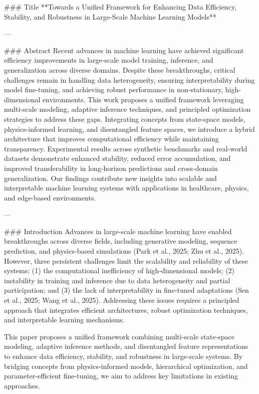 ### Title  
**Towards a Unified Framework for Enhancing Data Efficiency, Stability, and Robustness in Large-Scale Machine Learning Models**

---

### Abstract  
Recent advances in machine learning have achieved significant efficiency improvements in large-scale model training, inference, and generalization across diverse domains. Despite these breakthroughs, critical challenges remain in handling data heterogeneity, ensuring interpretability during model fine-tuning, and achieving robust performance in non-stationary, high-dimensional environments. This work proposes a unified framework leveraging multi-scale modeling, adaptive inference techniques, and principled optimization strategies to address these gaps. Integrating concepts from state-space models, physics-informed learning, and disentangled feature spaces, we introduce a hybrid architecture that improves computational efficiency while maintaining transparency. Experimental results across synthetic benchmarks and real-world datasets demonstrate enhanced stability, reduced error accumulation, and improved transferability in long-horizon predictions and cross-domain generalization. Our findings contribute new insights into scalable and interpretable machine learning systems with applications in healthcare, physics, and edge-based environments.

---

### Introduction  
Advances in large-scale machine learning have enabled breakthroughs across diverse fields, including generative modeling, sequence prediction, and physics-based simulations (Park et al., 2025; Zhu et al., 2025). However, three persistent challenges limit the scalability and reliability of these systems: (1) the computational inefficiency of high-dimensional models; (2) instability in training and inference due to data heterogeneity and partial participation; and (3) the lack of interpretability in fine-tuned adaptations (Sen et al., 2025; Wang et al., 2025). Addressing these issues requires a principled approach that integrates efficient architectures, robust optimization techniques, and interpretable learning mechanisms.  

This paper proposes a unified framework combining multi-scale state-space modeling, adaptive inference methods, and disentangled feature representations to enhance data efficiency, stability, and robustness in large-scale systems. By bridging concepts from physics-informed models, hierarchical optimization, and parameter-efficient fine-tuning, we aim to address key limitations in existing approaches.  

